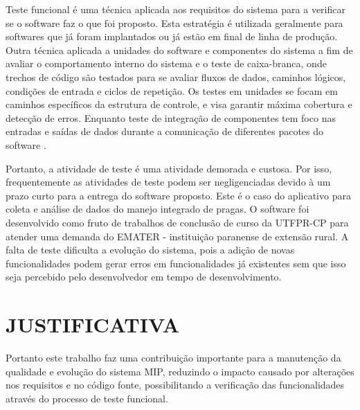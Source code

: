 Teste funcional é uma técnica aplicada aos requisitos do sistema para a verificar se o software faz o que foi proposto. Esta estratégia é utilizada geralmente para softwares que já foram implantados ou já estão em final de linha de produção. Outra técnica aplicada a unidades do software e componentes do sistema a fim de avaliar o comportamento interno do sistema e o teste de caixa-branca, onde trechos de código são testados para se avaliar fluxos de dados, caminhos lógicos, condições de entrada e ciclos de repetição. Os testes em unidades se focam em caminhos específicos da estrutura de controle, e visa garantir máxima cobertura e detecção de erros. Enquanto teste de integração de componentes tem foco nas entradas e saídas de dados durante a comunicação de diferentes pacotes do software \cite{PRESMA2016}.  


Portanto, a atividade de teste é uma atividade demorada e custosa. Por isso, frequentemente as atividades de teste podem ser negligenciadas devido à um prazo curto para a entrega do software proposto. Este é o caso do aplicativo para coleta e análise de dados do manejo integrado de pragas. O software foi desenvolvido como fruto de trabalhos de conclusão de curso da UTFPR-CP para atender uma demanda do EMATER - instituição paranense de extensão rural. A falta de teste dificulta a evolução do sistema, pois a adição de novas funcionalidades podem gerar erros em funcionalidades já existentes sem que isso seja percebido pelo desenvolvedor em tempo de desenvolvimento. 

\section{JUSTIFICATIVA}

Portanto este trabalho faz uma contribuição importante para a manutenção da qualidade e evolução do sistema MIP, reduzindo o impacto causado por alterações nos requisitos e no código fonte, possibilitando a verificação das funcionalidades através do processo de teste funcional. 

